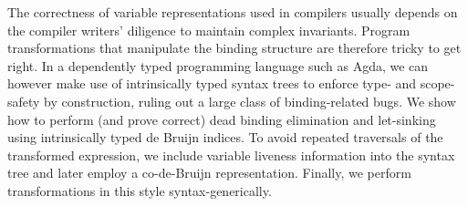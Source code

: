 The correctness of variable representations used in compilers
usually depends on the compiler writers' diligence to maintain complex invariants.
Program transformations that manipulate the binding structure are therefore tricky to get right.
In a dependently typed programming language such as Agda,
we can however make use of intrinsically typed syntax trees
to enforce type- and scope-safety by construction,
ruling out a large class of binding-related bugs.
We show how to perform (and prove correct) dead binding elimination and let-sinking using intrinsically typed de Bruijn indices.
To avoid repeated traversals of the transformed expression,
we include variable liveness information into the syntax tree and later employ a co-de-Bruijn representation.
Finally, we perform transformations in this style syntax-generically.
